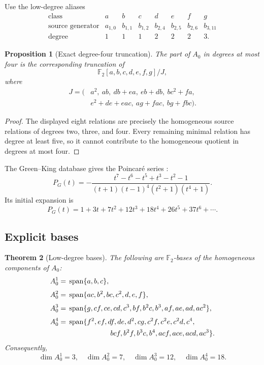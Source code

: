 \documentclass[11pt]{amsart}
\newtheorem{theorem}{Theorem}[section]
\newtheorem{proposition}[theorem]{Proposition}
\theoremstyle{definition}
\theoremstyle{remark}
\DeclareMathOperator{\Span}{span}
\newcommand{\F}{\mathbb F}
\begin{document}
Use the low-degree aliases
\[
\begin{array}{c|ccccccc}
\text{class}&a&b&c&d&e&f&g\\
\hline
\text{source generator}&a_{1,0}&b_{1,1}&b_{1,2}&b_{2,4}&b_{2,5}&b_{2,6}&b_{3,11}\\
\text{degree}&1&1&1&2&2&2&3.
\end{array}
\]

\begin{proposition}[Exact degree-four truncation]
\label{prop:truncation}
The part of \(A_0\) in degrees at most four is the corresponding truncation of
\[
\F_2[a,b,c,d,e,f,g]/J,
\]
where
\begin{equation}
\label{eq:low-relations}
\begin{aligned}
J=(&a^2,\ ab,\ db+ea,\ eb+db,\ bc^2+fa,\\
   &e^2+de+eac,\ ag+fac,\ bg+fbc).
\end{aligned}
\end{equation}
\end{proposition}

\begin{proof}
The displayed eight relations are precisely the homogeneous source relations of degrees two, three, and four.  Every remaining minimal relation has degree at least five, so it cannot contribute to the homogeneous quotient in degrees at most four.
\end{proof}

The Green--King database gives the Poincaré series \cite{GreenKingDatabase}:
\[
P_G(t)=
-\frac{t^7-t^6-t^5+t^3-t^2-1}
{(t+1)(t-1)^4(t^2+1)(t^4+1)}.
\]
Its initial expansion is
\begin{equation}
\label{eq:poincare-expansion}
P_G(t)=1+3t+7t^2+12t^3+18t^4+26t^5+37t^6+\cdots.
\end{equation}

\subsection{Explicit bases}

\begin{theorem}[Low-degree bases]
\label{thm:low-bases}
The following are \(\F_2\)-bases of the homogeneous components of \(A_0\):
\begin{align*}
A_0^1={}&\Span\{a,b,c\},\\[1mm]
A_0^2={}&\Span\{ac,b^2,bc,c^2,d,e,f\},\\[1mm]
A_0^3={}&\Span\{g,cf,ce,cd,c^3,bf,b^2c,b^3,af,ae,ad,ac^2\},\\[1mm]
A_0^4={}&\Span\{f^2,ef,df,de,d^2,cg,c^2f,c^2e,c^2d,c^4,\\
&\hspace{21mm}bcf,b^2f,b^3c,b^4,acf,ace,acd,ac^3\}.
\end{align*}
Consequently,
\[
\dim A_0^1=3,
\quad \dim A_0^2=7,
\quad \dim A_0^3=12,
\quad \dim A_0^4=18.
\]
\end{theorem}
\end{document}
